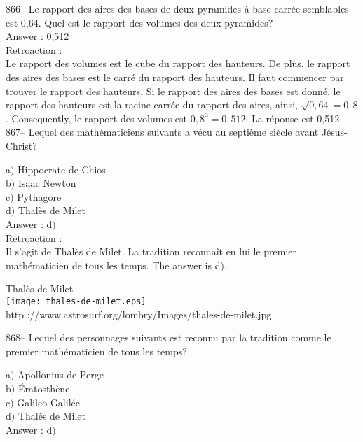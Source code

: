 ﻿\documentclass[letterpaper, 12pt]{article}
\begin{document}
866-- Le rapport des aires des bases de deux pyramides \`a base carr\'ee
semblables est 0,64.  Quel est le rapport des volumes des deux pyramides?\\

Answer : 0,512\\

Retroaction : \\
Le rapport des volumes est le cube du rapport des hauteurs.  De
plus, le rapport des aires des bases est le carr\'e du rapport des
hauteurs.  Il faut commencer par trouver le rapport des hauteurs.
Si le rapport des aires des bases est donn\'e, le rapport des
hauteurs est la racine carr\'ee du rapport des aires, ainsi,
$\sqrt{0,64}=0,8$.
Consequently, le rapport des volumes est $0,8^{3}=0,512$. La r\'eponse
est 0,512.\\


867-- Lequel des math\'ematiciens suivants a v\'ecu au septi\`eme
si\`ecle avant J\'esus-Christ?

a$)$ Hippocrate de Chios \\
b$)$ Isaac Newton \\
c$)$ Pythagore \\
d$)$ Thal\`es de Milet\\

Answer : d$)$\\

Retroaction :\\
Il s'agit de Thal\`es de Milet. La tradition reconna\^it en lui le
premier math\'ematicien de tous les temps. The answer is
d$)$.

    \begin{center}
        Thal\`es de Milet\\
    \texttt{[image: thales-de-milet.eps]}\\
        {\footnotesize http
://www.astrosurf.org/lombry/Images/thales-de-milet.jpg}
    \end{center}

868-- Lequel des personnages suivants est reconnu par la tradition
comme le premier math\'ematicien de tous les temps?

a$)$ Apollonius de Perge \\
b$)$ \'Eratosth\`ene \\
c$)$ Galileo Galil\'ee \\
d$)$ Thal\`es de Milet \\

Answer : d$)$\\
\end{document}
